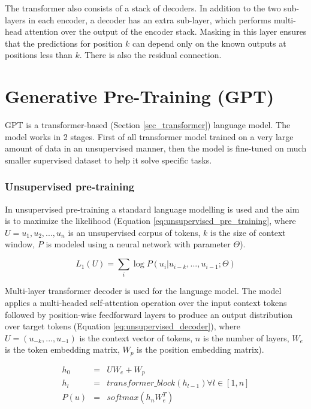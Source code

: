 The transformer also consists of a stack of decoders. In addition to the two sub-layers in each encoder, a decoder has an extra sub-layer, which performs multi-head attention over the output of the encoder stack. Masking in this layer ensures that the predictions for position $k$ can depend only on the known outputs at positions less than $k$. There is also the residual connection. 

\section{Generative Pre-Training (GPT)} \label{sec_gpt}
GPT \cite{radford2018improving} is a transformer-based (Section \ref{sec_transformer}) language model. The model works in 2 stages. First of all transformer model trained on a very large amount of data in an unsupervised manner, then the model is fine-tuned on much smaller supervised dataset to help it solve specific tasks.

\subsubsection{Unsupervised pre-training}
In unsupervised pre-training a standard language modelling is used and the aim is to maximize the likelihood (Equation \ref{eq:unsupervised_pre_training}, where $U = {u_1, u_2, ... , u_n}$ is an unsupervised corpus of tokens, $k$ is the size of context window, $P$ is modeled using a neural network with parameter $\Theta$).

\begin{equation} \label{eq:unsupervised_pre_training}
L_1(U) = \sum_i \log P(u_i|u_{i-k}, ... , u_{i-1}; \Theta)
\end{equation}

Multi-layer transformer decoder is used for the language model. The model applies a multi-headed self-attention operation over the input context tokens followed by position-wise feedforward layers to produce an output distribution
over target tokens (Equation \ref{eq:unsupervised_decoder}), where $U = (u_{-k}, ... , u_{-1})$ is the context vector of tokens, $n$ is the number of layers, $W_e$ is the token embedding matrix, $W_p$ is the position embedding matrix).

\begin{equation}  \label{eq:unsupervised_decoder}
\begin{array}{lcl} 
h_0 & = &UW_e + W_p \\

h_l & = & transformer\_block(h_{l-1}) \forall l \in [1,n] \\

P(u) & = & softmax(h_n W_e^T) \\
\end{array}
\end{equation}

